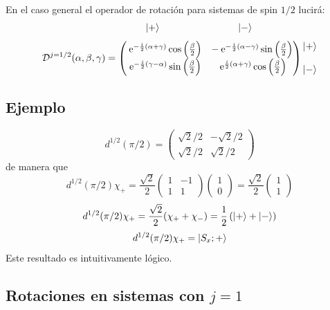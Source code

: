 \documentclass[10pt,oneside]{CBFT_book}
\begin{document}
En el caso general el operador de rotación para sistemas de spin $1/2$ lucirá:
\[
	\begin{matrix} \qquad\qquad \Ket{+} \qquad\qquad\qquad\qquad \Ket{-} \end{matrix}
\]
\[
	\mathcal{D}^{j=1/2} (\alpha,\beta,\gamma) = \begin{pmatrix}
	        \:\mathrm{e}^{-\frac{i}{2}(\alpha + \gamma)} \cos\left(\frac{\beta}{2}\right) & 
			- \:\mathrm{e}^{-\frac{i}{2}(\alpha - \gamma)} \sin\left(\frac{\beta}{2}\right) \\
	        \:\mathrm{e}^{-\frac{i}{2}(\gamma -\alpha )} \sin\left(\frac{\beta}{2}\right) & 
			\:\mathrm{e}^{\frac{i}{2}(\alpha + \gamma)} \cos\left(\frac{\beta}{2}\right)
	       \end{pmatrix} 
	       \begin{matrix} \Ket{+} \\ \\  \Ket{-} \end{matrix}
\]

\subsection{Ejemplo}

\[
	d^{1/2}(\pi/2) = \begin{pmatrix}
	                  \sqrt{2}/2 & -\sqrt{2}/2 \\
	                  \sqrt{2}/2 & \sqrt{2}/2
	                 \end{pmatrix}
\]
de manera que 
\[
	d^{1/2}(\pi/2)\chi_{+} = \frac{\sqrt{2}}{2}\begin{pmatrix} 1 & -1 \\  1 & 1 \end{pmatrix}
	                                           \begin{pmatrix}  1 \\ 0  \end{pmatrix} 
				= \frac{\sqrt{2}}{2} \begin{pmatrix}  1 \\ 1 \end{pmatrix} 
\]
\[
	d^{1/2}(\pi/2)\chi_{+} = \frac{\sqrt{2}}{2} (\chi_+ + \chi_- )  = \frac{1}{2} \left( \Ket{+} + \Ket{-} \right)
\]
\[
	d^{1/2}(\pi/2)\chi_{+} = \Ket{S_x ; + }
\]
Este resultado es intuitivamente lógico.


\subsection{Rotaciones en sistemas con $j=1$}
\end{document}
